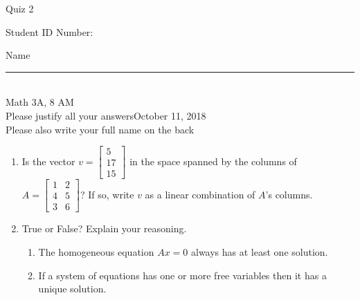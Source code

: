 \documentclass[12pt]{article}
\begin{document}
\begin{flushleft} 
\centerline{\LARGE{Quiz 2}} 
\vspace{5 mm}
{Student ID Number:}\hfill  
{Name \rule {2 in}{0.01in}}\\
Math 3A, 8 AM
\\
{Please justify all your answers}\hfill {October 11, 2018}
\\
{Please also write your full name on the back} 

\medskip
\end{flushleft}

\begin{enumerate}
	\item Is the vector $v = \begin{bmatrix}
		5\\17\\15
	\end{bmatrix}$ in the space spanned by the columns of $A = \begin{bmatrix}
		1 & 2\\4&5\\3&6
	\end{bmatrix}$? If so, write $v$ as a linear combination of $A$'s columns.

	\vfill

	\item True or False? Explain your reasoning.
	\begin{enumerate}
		\item The homogeneous equation $Ax = 0$ always has at least one solution.
		\vfill
		\item If a system of equations has one or more free variables then it has a unique solution.
		\vfilln
	\end{enumerate}
\end{enumerate}

\end{document}
